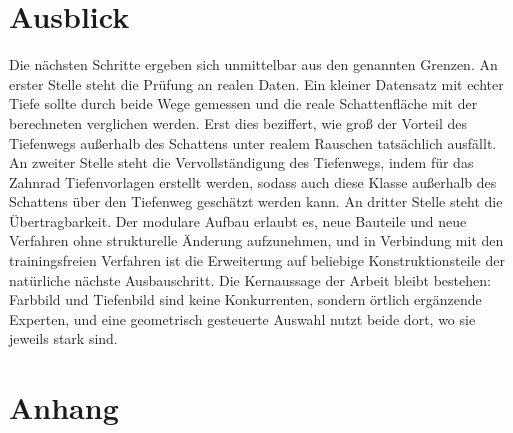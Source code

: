 \documentclass[oneside,studentpaper]{wbk}
\begin{document}
\chapter{Ausblick}

Die nächsten Schritte ergeben sich unmittelbar aus den genannten Grenzen. An
erster Stelle steht die Prüfung an realen Daten. Ein kleiner Datensatz mit echter
Tiefe sollte durch beide Wege gemessen und die reale Schattenfläche mit der
berechneten verglichen werden. Erst dies beziffert, wie groß der Vorteil des
Tiefenwegs außerhalb des Schattens unter realem Rauschen tatsächlich ausfällt. An
zweiter Stelle steht die Vervollständigung des Tiefenwegs, indem für das Zahnrad
Tiefenvorlagen erstellt werden, sodass auch diese Klasse außerhalb des Schattens
über den Tiefenweg geschätzt werden kann. An dritter Stelle steht die
Übertragbarkeit. Der modulare Aufbau erlaubt es, neue Bauteile und neue Verfahren
ohne strukturelle Änderung aufzunehmen, und in Verbindung mit den trainingsfreien
Verfahren ist die Erweiterung auf beliebige Konstruktionsteile der natürliche
nächste Ausbauschritt. Die Kernaussage der Arbeit bleibt bestehen: Farbbild und
Tiefenbild sind keine Konkurrenten, sondern örtlich ergänzende Experten, und eine
geometrisch gesteuerte Auswahl nutzt beide dort, wo sie jeweils stark sind.

\backmatter

\listoffigures

\newpage
\listoftables

\newpage
\lstlistoflistings

	\cleardoublepage
	

\clearpage{\pagestyle{scrheadings}\cleardoublepage}

\renewcommand{\thefigure}{A.\arabic{figure}}
\renewcommand{\thetable}{A.\arabic{table}}
\renewcommand{\thelstlisting}{A.\arabic{lstlisting}}

\setcounter{figure}{0}
\chapter{Anhang}
\quad  \addtocounter{page}{-1}
\end{document}
